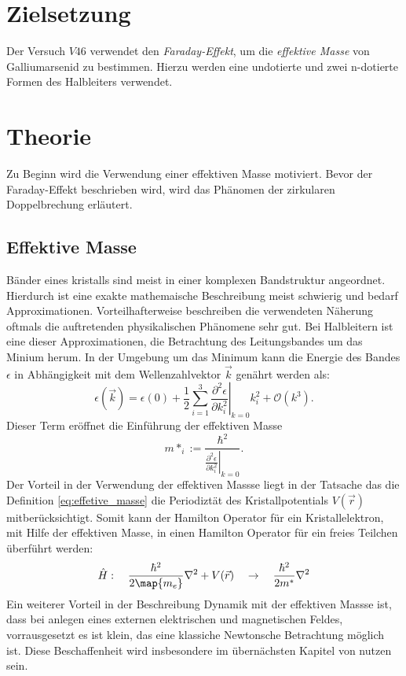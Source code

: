 \setcounter{page}{1}
\section*{Zielsetzung}
Der Versuch $V46$ verwendet den \emph{Faraday-Effekt}, um die \emph{effektive Masse} von
Galliumarsenid zu bestimmen. Hierzu werden eine undotierte und zwei n-dotierte
Formen des Halbleiters verwendet.

\section{Theorie}
Zu Beginn wird die Verwendung einer effektiven Masse motiviert.
Bevor der Faraday-Effekt beschrieben wird, wird das Phänomen der zirkularen
Doppelbrechung erläutert.

\subsection{Effektive Masse}
 Bänder eines kristalls sind meist in einer komplexen Bandstruktur angeordnet.
Hierdurch ist eine exakte mathemaische Beschreibung meist schwierig und bedarf
Approximationen. Vorteilhafterweise beschreiben die verwendeten Näherung oftmals
die auftretenden physikalischen Phänomene sehr gut. Bei Halbleitern ist eine
dieser Approximationen, die Betrachtung des Leitungsbandes um das Minium herum.
In der Umgebung um das Minimum kann die Energie des Bandes $\epsilon$
in Abhängigkeit mit dem Wellenzahlvektor $\vec{k}$ genährt werden als:
\begin{equation}
  \label{eq:gleichung_energie}
  \epsilon(\vec{k})=\epsilon(0) + \frac{1}{2}\sum_{i=1}^3 \left.\frac{\partial^2 \epsilon}{\partial k_i^2}\right|_{k=0}k_i^2 + \mathcal{O}(k^3).
\end{equation}
Dieser Term eröffnet die Einführung der effektiven Masse
\begin{equation}
  \label{eq:effetive_masse}
  m*_i := \frac{\hbar^2}{\left.\frac{\partial^2 \epsilon}{\partial k_i^2}\right|_{k=0}}.
\end{equation}
Der Vorteil in der Verwendung der effektiven Massse liegt in der Tatsache das
die Definition \eqref{eq:effetive_masse} die Periodiztät des  Kristallpotentials
$V(\vec{r})$ mitberücksichtigt. Somit kann der Hamilton Operator für ein Kristallelektron,
mit Hilfe der effektiven Masse, in einen Hamilton Operator für ein freies
Teilchen überführt werden:
\begin{equation*}
  \hat{H}:\quad \frac{\hbar^2}{2\map{m_e}}\nabla^2 + V(\vec{r}) \quad \rightarrow \quad   \frac{\hbar^2}{2m^*}\nabla^2
\end{equation*}
Ein weiterer Vorteil in der Beschreibung Dynamik mit der effektiven Massse ist,
dass bei anlegen eines externen elektrischen und magnetischen Feldes,
vorrausgesetzt es ist klein, das eine klassiche Newtonsche Betrachtung möglich ist.
Diese Beschaffenheit wird insbesondere im übernächsten Kapitel von nutzen sein.
